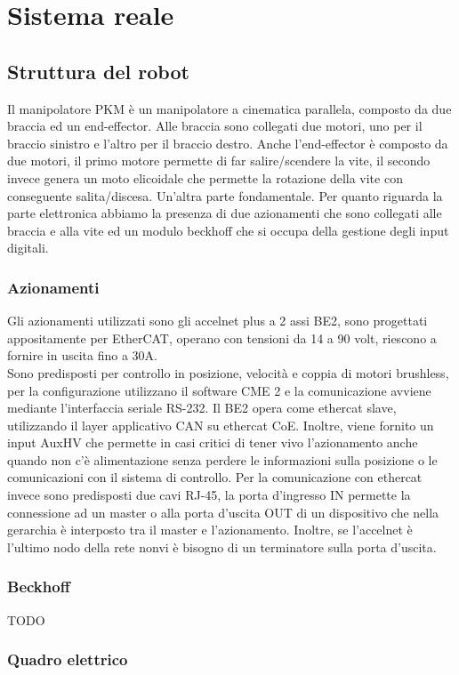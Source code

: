 \section{Sistema reale}
\subsection{Struttura del robot}
Il manipolatore PKM è un manipolatore a cinematica parallela, composto da due braccia ed un end-effector. Alle braccia sono collegati due motori, uno per il braccio sinistro e l'altro per il braccio destro. Anche l'end-effector è composto da due motori, il primo motore permette di far salire/scendere la vite, il secondo invece genera un moto elicoidale che permette la rotazione della vite con conseguente salita/discesa. Un'altra parte fondamentale.
Per quanto riguarda la parte elettronica abbiamo la presenza di due azionamenti che sono collegati alle braccia e alla vite ed un modulo beckhoff che si occupa della gestione degli input digitali.
\subsubsection{Azionamenti}
Gli azionamenti utilizzati sono gli accelnet plus a 2 assi BE2, sono progettati appositamente per EtherCAT, operano con tensioni da 14 a 90 volt, riescono a fornire in uscita fino a 30A.
\\Sono predisposti per controllo in posizione, velocità e coppia di motori brushless, per la configurazione utilizzano il software CME 2 e la comunicazione avviene mediante l'interfaccia seriale RS-232. Il BE2 opera come ethercat slave, utilizzando il layer applicativo CAN su ethercat CoE. Inoltre, viene fornito un input AuxHV che permette in casi critici di tener vivo l'azionamento anche quando non c'è alimentazione senza perdere le informazioni sulla posizione o le comunicazioni con il sistema di controllo.
Per la comunicazione con ethercat invece sono predisposti due cavi RJ-45, la porta d'ingresso IN permette la connessione ad un master o alla porta d'uscita OUT di un dispositivo che nella gerarchia è interposto tra il master e l'azionamento. Inoltre, se l'accelnet è l'ultimo nodo della rete nonvi è bisogno di un terminatore sulla porta d'uscita.
 
\subsubsection{Beckhoff}
TODO
\subsubsection{Quadro elettrico}
